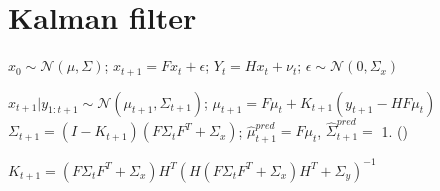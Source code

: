 \section{Kalman filter}

$x_0 \sim \mathcal{N}(\mu, \Sigma)$; $x_{t+1} = F x_t + \epsilon$; $Y_t = H x_t + \nu_t$; $\epsilon \sim \mathcal{N}(0, \Sigma_x)$

$x_{t+1} | y_{1:t+1} \sim \mathcal{N}(\mu_{t+1}, \Sigma_{t+1})$;
$\mu_{t+1} = F \mu_{t} + K_{t+1} (y_{t+1} - H F \mu_{t})$
$\Sigma_{t+1} = (I - K_{t+1})(F \Sigma_t F^T + \Sigma_x )$; 
$\hat{\mu}_{t+1}^{pred} = F \mu_t$,
$\hat{\Sigma}_{t+1}^{pred} =$ 1. ()

$K_{t+1} = (F \Sigma_t F^T + \Sigma_x)H^T(H(F \Sigma_t F^T + \Sigma_x)H^T + \Sigma_y)^{-1}$